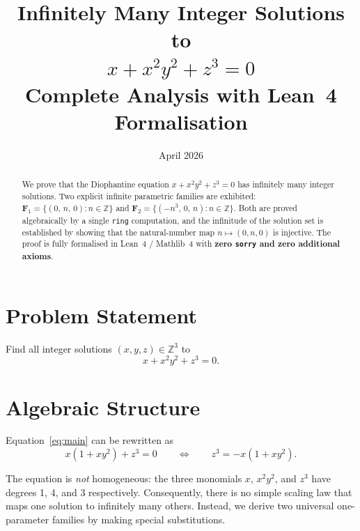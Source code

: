 \documentclass[12pt,a4paper]{article}
\title{%
  \Large\bfseries Infinitely Many Integer Solutions to\\[6pt]
  \Huge $x + x^2 y^2 + z^3 = 0$\\[10pt]
  \large Complete Analysis with Lean~4 Formalisation}
\author{}
\date{April 2026}
\theoremstyle{definition}
\newcommand{\Z}{\mathbb{Z}}
\begin{document}
\maketitle
\thispagestyle{fancy}

\begin{abstract}
We prove that the Diophantine equation $x + x^2 y^2 + z^3 = 0$ has infinitely many
integer solutions.  Two explicit infinite parametric families are exhibited:
$\mathbf{F}_1 = \{(0,\,n,\,0) : n \in \Z\}$ and $\mathbf{F}_2 = \{(-n^3,\,0,\,n) : n \in \Z\}$.
Both are proved algebraically by a single \texttt{ring} computation, and the infinitude
of the solution set is established by showing that the natural-number map
$n \mapsto (0, n, 0)$ is injective.  The proof is fully formalised in Lean~4 / Mathlib~4
with \textbf{zero \texttt{sorry} and zero additional axioms}.
\end{abstract}

\tableofcontents
\bigskip

\section{Problem Statement}

Find all integer solutions $(x, y, z) \in \Z^3$ to
\begin{equation}\label{eq:main}
  x + x^2 y^2 + z^3 = 0.
\end{equation}

\section{Algebraic Structure}

Equation~\eqref{eq:main} can be rewritten as
\begin{equation}\label{eq:factored}
  x(1 + x y^2) + z^3 = 0 \qquad \Longleftrightarrow \qquad z^3 = -x(1 + xy^2).
\end{equation}

\noindent The equation is \emph{not} homogeneous: the three monomials $x$, $x^2 y^2$, and
$z^3$ have degrees 1, 4, and 3 respectively.  Consequently, there is no simple scaling law
that maps one solution to infinitely many others.  Instead, we derive two universal
one-parameter families by making special substitutions.
\end{document}

